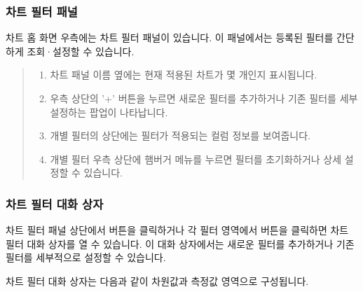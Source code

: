 \documentclass[letterpaper,10pt,english]{sphinxmanual}
\begin{document}
\subsubsection{차트 필터 패널}
\label{\detokenize{discovery/part04/chart_filter:id3}}
차트 홈 화면 우측에는 차트 필터 패널이 있습니다. 이 패널에서는 등록된 필터를 간단하게 조회·설정할 수 있습니다.
\begin{quote}

\begin{figure}[H]
\centering

\noindent{}
\end{figure}
\begin{enumerate}
\def\theenumi{\arabic{enumi}}
\def\labelenumi{\theenumi .}
\makeatletter\def\p@enumii{\p@enumi \theenumi .}\makeatother
\item {} 
 차트 패널 이름 옆에는 현재 적용된 차트가 몇 개인지 표시됩니다.

\item {} 
 우측 상단의 '+' 버튼을 누르면 새로운 필터를 추가하거나 기존 필터를 세부 설정하는 팝업이 나타납니다.

\item {} 
 개별 필터의 상단에는 필터가 적용되는 컬럼 정보를 보여줍니다.

\item {} 
 개별 필터 우측 상단에 햄버거 메뉴를 누르면 필터를 초기화하거나 상세 설정할 수 있습니다.

\end{enumerate}
\end{quote}


\subsubsection{차트 필터 대화 상자}
\label{\detokenize{discovery/part04/chart_filter:id4}}
차트 필터 패널 상단에서 버튼을 클릭하거나 각 필터 영역에서 버튼을 클릭하면 차트 필터 대화 상자를 열 수 있습니다. 이 대화 상자에서는 새로운 필터를 추가하거나 기존 필터를 세부적으로 설정할 수 있습니다.

차트 필터 대화 상자는 다음과 같이 차원값과 측정값 영역으로 구성됩니다.
\begin{quote}

\begin{figure}[H]
\centering

\noindent{}
\end{figure}
\end{quote}
\end{document}
